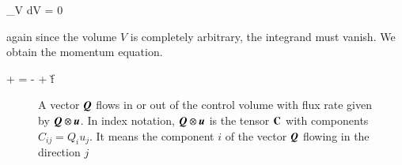 \beq
\int_V dV = 0 
\eeq

\noindent again since the volume $V$ is completely arbitrary, the integrand must
vanish. We obtain the momentum equation. 

\beq
{} +  = - + \rho\v{f}
\label{eq:momentum-conservative}
\eeq


\begin{figure}
  \begin{center}
  \end{center}
  \caption[]{A vector ${\boldsymbol{Q}}$ flows in or out of the control volume
    with flux rate given by ${\boldsymbol{Q}}\otimes{\boldsymbol{u}}$. In index notation, ${\boldsymbol{Q}}\otimes{\boldsymbol{u}}$ is the
tensor $\boldsymbol{\mathrm{C}}$ with components $C_{ij} = Q_i u_j$. It means the component $i$ of the
vector ${\boldsymbol{Q}}$ flowing in the direction $j$}
  \label{fig:momentumflux}
\end{figure}

